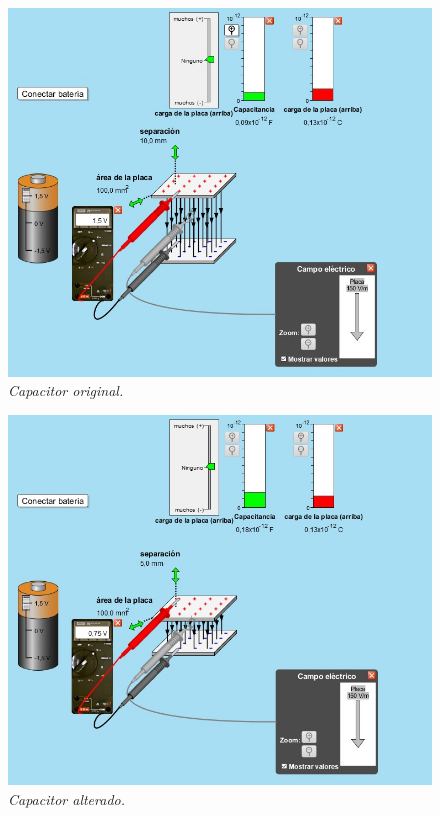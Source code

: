 \documentclass[12pt]{report}
\begin{document}
\begin{enumerate}
\begin{enumerate}
      \begin{figure}[h]
          \centering
          \begin{minipage}[h]{0.4\textwidth}
          \centering
          \includegraphics[width=1\textwidth]{./images/3foto1.jpg}
          \textit{Capacitor original.} 
          \end{minipage}\hskip 1cm
          \begin{minipage}[h]{0.4\textwidth}
          \centering
          \includegraphics[width=1\textwidth]{./images/3foto2.jpg}
          \textit{Capacitor alterado.} 
       \end{minipage}
      \end{figure}


\end{enumerate}
\end{enumerate}
\end{document}
